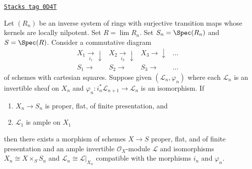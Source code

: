 \begin{lemma}
\label{quot-lemma-polarized-strong-effectiveness}
\href{https://stacks.math.columbia.edu/tag/0D4T}{\texttt{Stacks tag 0D4T}}


Let $(R_n)$ be an inverse system of rings with surjective transition maps
whose kernels are locally nilpotent. Set $R = \lim R_n$.
Set $S_n = \Spec(R_n)$ and $S = \Spec(R)$. Consider a commutative diagram
$$
\begin{array}{cccc}X_1 \underset{i_1}{\longrightarrow}\downarrow & X_2 \underset{i_2}{\longrightarrow}\downarrow & X_3 \longrightarrow\downarrow & \ldots \\ S_1 \longrightarrow & S_2 \longrightarrow & S_3 \longrightarrow & \ldots\end{array}
$$
of schemes with cartesian squares. Suppose given $(\mathcal{L}_n, \varphi_n)$
where each $\mathcal{L}_n$ is an invertible sheaf on $X_n$ and
$\varphi_n : i_n^*\mathcal{L}_{n + 1} \to \mathcal{L}_n$ is an isomorphism.
If
\begin{enumerate}
\item $X_n \to S_n$ is proper, flat, of finite presentation, and
\item $\mathcal{L}_1$ is ample on $X_1$
\end{enumerate}
then there exists a morphism of schemes $X \to S$
proper, flat, and of finite presentation
and an ample invertible $\mathcal{O}_X$-module $\mathcal{L}$
and isomorphisms $X_n \cong X \times_S S_n$ and
$\mathcal{L}_n \cong \mathcal{L}|_{X_n}$ compatible with
the morphisms $i_n$ and $\varphi_n$.
\end{lemma}

